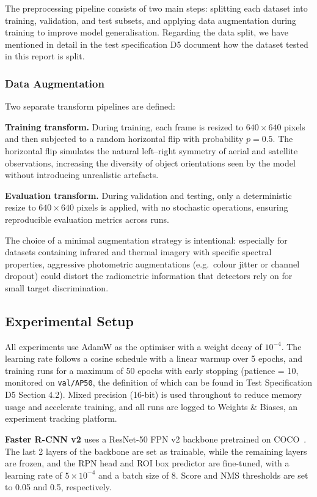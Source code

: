 \documentclass[11pt]{article}
\begin{document}
The preprocessing pipeline consists of two main steps: splitting each dataset into training, validation, and test subsets, and applying data 
augmentation during training to improve model generalisation. Regarding the data split, we have mentioned in detail in the test specification 
D5 document how the dataset tested in this report is split.

\subsubsection{Data Augmentation}

Two separate transform pipelines are defined:

\textbf{Training transform.} During training, each frame is resized to $640 \times 640$ pixels and then subjected to a random horizontal flip with probability $p = 0.5$. 
The horizontal flip simulates the natural left--right symmetry of aerial and satellite observations, increasing the diversity of object orientations seen by the model 
without introducing unrealistic artefacts.

\textbf{Evaluation transform.} During validation and testing, only a deterministic resize to $640 \times 640$ pixels is applied, with no stochastic operations, ensuring 
reproducible evaluation metrics across runs.

The choice of a minimal augmentation strategy is intentional: especially for datasets containing infrared and thermal imagery with specific spectral properties, 
aggressive photometric augmentations (e.g.\ colour jitter or channel dropout) could distort the radiometric information that detectors rely on for small target discrimination.

\subsection{Experimental Setup}

All experiments use AdamW as the optimiser with a weight decay of $10^{-4}$. 
The learning rate follows a cosine schedule with a linear warmup over 5 epochs, 
and training runs for a maximum of 50 epochs with early stopping (patience = 10, 
monitored on \texttt{val/AP50}, the definition of which can be found in Test 
Specification D5 Section 4.2). Mixed precision (16-bit) is used throughout to reduce 
memory usage and accelerate training, and all runs are logged to Weights \& Biases, 
an experiment tracking platform.

\textbf{Faster R-CNN v2} uses a ResNet-50 FPN v2 backbone pretrained on COCO~\cite{lin2014microsoft}. 
The last 2 layers of the backbone are set as trainable, while the remaining layers are frozen, 
and the RPN head and ROI box predictor are fine-tuned, 
with a learning rate of $5 \times 10^{-4}$ and a batch size of 8. 
Score and NMS thresholds are set to 0.05 and 0.5, respectively.
\end{document}
